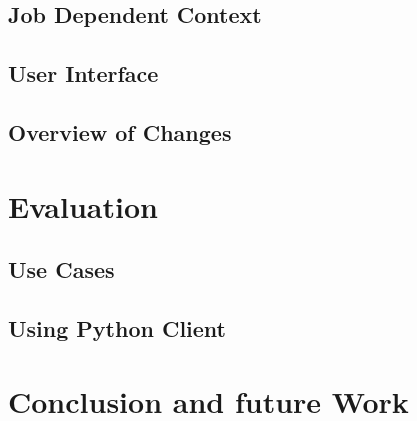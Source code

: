 \documentclass[draft,final]{vutinfth} %
\begin{document}
\section{Job Dependent Context}
\section{User Interface}
\section{Overview of Changes}


\chapter{Evaluation}
\section{Use Cases}
\section{Using Python Client}



\chapter{Conclusion and future Work}



\backmatter

\listoffigures %

\cleardoublepage %
\listoftables %


\printindex

\printglossaries



\end{document}
